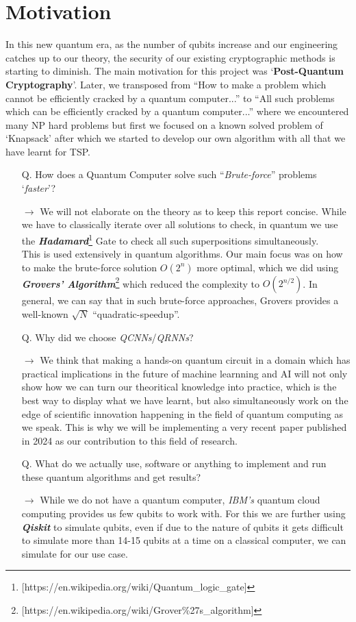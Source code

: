 \documentclass[a4paper]{article}
\begin{document}
\section*{Motivation}
In this new quantum era, as the number of qubits increase and our engineering catches up to our theory, the security of our existing cryptographic methods is starting to diminish. The main motivation for this project was `\textbf{Post-Quantum Cryptography}'. Later, we transposed from ``How to make a problem which cannot be efficiently cracked by a quantum computer...'' to ``All such problems which can be efficiently cracked by a quantum computer...'' where we encountered many NP hard problems but first we focused on a known solved problem of `Knapsack' after which we started to develop our own algorithm with all that we have learnt for TSP.
\begin{itemize}
\item[Q.] How does a Quantum Computer solve such ``\emph{Brute-force}'' problems `\emph{faster}'?
\item[\textbf{$\rightarrow$}] We will not elaborate on the theory as to keep this report concise. While we have to classically iterate over all solutions to check, in quantum we use the \textbf{\emph{Hadamard}}\footnote{[https://en.wikipedia.org/wiki/Quantum\_logic\_gate]} Gate to check all such superpositions simultaneously.\vspace{5pt}\\
This is used extensively in quantum algorithms. Our main focus was on how to make the brute-force solution $O(2^{n})$ more optimal, which we did using \emph{\textbf{Grovers' Algorithm}}\footnote{[https://en.wikipedia.org/wiki/Grover\%27s\_algorithm]} which reduced the complexity to $O(2^{n/2})$. In general, we can say that in such brute-force approaches, Grovers provides a well-known $\sqrt{N}$ ``quadratic-speedup''.

\item[Q.] Why did we choose \emph{QCNNs}/\emph{QRNNs}?
\item[\textbf{$\rightarrow$}] We think that making a hands-on quantum circuit in a domain which has practical implications in the future of machine learnning and AI will not only show how we can turn our theoritical knowledge into practice, which is the best way to display what we have learnt, but also simultaneously work on the edge of scientific innovation happening in the field of quantum computing as we speak. This is why we will be implementing a very recent paper published in 2024 as our contribution to this field of research.

\item[Q.] What do we actually use, software or anything to implement and run these quantum algorithms and get results?
\item[\textbf{$\rightarrow$}] While we do not have a quantum computer,  \emph{IBM's} quantum cloud computing provides us few qubits to work with. For this we are further using \textbf{\emph{Qiskit}} to simulate qubits, even if due to the nature of qubits it gets difficult to simulate more than 14-15 qubits at a time on a classical computer, we can simulate for our use case.
\end{itemize}
\end{document}
